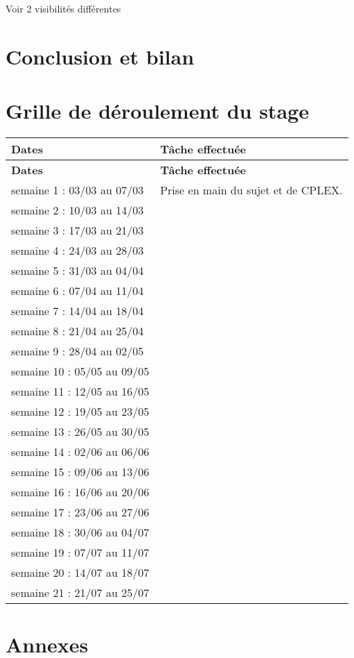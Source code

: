 \documentclass[a4paper,12pt,twoside,french]{article}
\begin{document}
Voir 2 visibilités différentes

\section{Conclusion et bilan}

\section{Grille de déroulement du stage}


\begin{longtable}[H]{| m{5cm} | m{10cm} |}
\hline
\textbf{Dates} & \textbf{Tâche effectuée}\\
\hline
\endfirsthead

\hline
\textbf{Dates} & \textbf{Tâche effectuée}\\
\hline
\endhead

\hline
\endfoot

\hline
\endlastfoot

semaine 1 : 03/03 au 07/03 & Prise en main du sujet et de CPLEX. \\
\hline
semaine 2 : 10/03 au 14/03 & \\
\hline
semaine 3 : 17/03 au 21/03 & \\
\hline
semaine 4 : 24/03 au 28/03 & \\
\hline
semaine 5 : 31/03 au 04/04 & \\
\hline
semaine 6 : 07/04 au 11/04 & \\
\hline
semaine 7 : 14/04 au 18/04 & \\
\hline
semaine 8 : 21/04 au 25/04 & \\
\hline
semaine 9 : 28/04 au 02/05 & \\
\hline
semaine 10 : 05/05 au 09/05 & \\
\hline
semaine 11 : 12/05 au 16/05 & \\
\hline
semaine 12 : 19/05 au 23/05 & \\
\hline
semaine 13 : 26/05 au 30/05 & \\
\hline
semaine 14 : 02/06 au 06/06 & \\
\hline
semaine 15 : 09/06 au 13/06 & \\
\hline
semaine 16 : 16/06 au 20/06 & \\
\hline
semaine 17 : 23/06 au 27/06 & \\
\hline
semaine 18 : 30/06 au 04/07 & \\
\hline
semaine 19 : 07/07 au 11/07 & \\
\hline
semaine 20 : 14/07 au 18/07 & \\
\hline
semaine 21 : 21/07 au 25/07 & \\
\end{longtable}


\newpage
\printbibliography[
heading=bibintoc,
title={Bibliographie}
]

\newpage
\section{Annexes}
\end{document}
